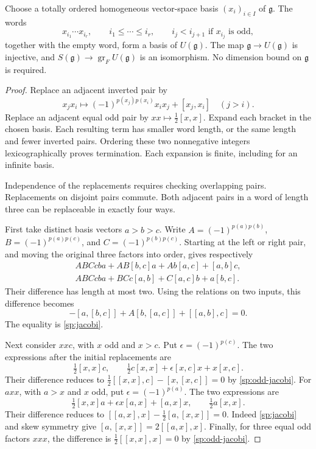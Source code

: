 \begin{theorem}
\label{sp:pbw}
Choose a totally ordered homogeneous vector-space basis $(x_i)_{i\in I}$
of $\mathfrak g$.  The words
\[
 x_{i_1}\cdots x_{i_r},\qquad i_1\leq\cdots\leq i_r,
 \qquad i_j<i_{j+1}\text{ if }x_{i_j}\text{ is odd},
\]
together with the empty word, form a basis of $U(\mathfrak g)$.
The map $\mathfrak g\to U(\mathfrak g)$ is injective, and
$S(\mathfrak g)\to\operatorname{gr}_F U(\mathfrak g)$ is an
isomorphism.  No dimension bound on $\mathfrak g$ is required.
\end{theorem}

\begin{proof}
Replace an adjacent inverted pair by
\[
 x_jx_i\longmapsto(-1)^{p(x_j)p(x_i)}x_ix_j+[x_j,x_i]
 \quad(j>i).
\]
Replace an adjacent equal odd pair by
$xx\longmapsto\tfrac12[x,x]$.
Expand each bracket in the chosen basis.  Each resulting term has
smaller word length, or the same length and fewer inverted pairs.
Ordering these two nonnegative integers lexicographically proves
termination.  Each expansion is finite, including for an infinite basis.

Independence of the replacements requires checking overlapping pairs.
Replacements on disjoint pairs commute.  Both adjacent pairs in a
word of length three can be replaceable in exactly four ways.

First take distinct basis vectors $a>b>c$.  Write
$A=(-1)^{p(a)p(b)}$, $B=(-1)^{p(a)p(c)}$, and
$C=(-1)^{p(b)p(c)}$.  Starting at the left or right pair, and moving
the original three factors into order, gives respectively
\begin{align*}
 ABCcba+AB[b,c]a+A b[a,c]+[a,b]c,\\
 ABCcba+BCc[a,b]+C[a,c]b+a[b,c].
\end{align*}
Their difference has length at most two.  Using the relations on two inputs, this difference becomes
\[
 -[a,[b,c]]+A[b,[a,c]]+[[a,b],c]=0.
\]
The equality is \eqref{sp:jacobi}.

Next consider $xxc$, with $x$ odd and $x>c$.  Put
$\epsilon=(-1)^{p(c)}$.  The two expressions after the initial
replacements are
\[
 \tfrac12[x,x]c,\qquad
 \tfrac12c[x,x]+\epsilon[x,c]x+x[x,c].
\]
Their difference reduces to
$\tfrac12[[x,x],c]-[x,[x,c]]=0$ by \eqref{sp:odd-jacobi}.
For $axx$, with $a>x$ and $x$ odd, put
$\epsilon=(-1)^{p(a)}$.  The two expressions are
\[
 \tfrac12[x,x]a+\epsilon x[a,x]+[a,x]x,\qquad
 \tfrac12a[x,x].
\]
Their difference reduces to
$[[a,x],x]-\tfrac12[a,[x,x]]=0$.
Indeed \eqref{sp:jacobi} and skew symmetry give
$[a,[x,x]]=2[[a,x],x]$.
Finally, for three equal odd factors $xxx$, the difference is
$\tfrac12[[x,x],x]=0$ by \eqref{sp:odd-jacobi}.


\end{proof}
